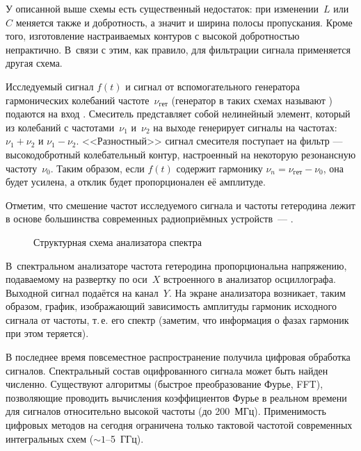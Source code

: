 \experiment

У описанной выше схемы есть существенный недостаток: при изменении~$L$ или~$C$
меняется также и добротность, а значит и ширина полосы пропускания.
Кроме того, изготовление настраиваемых контуров с высокой добротностью
непрактично. В~связи с этим, как правило, для фильтрации сигнала
применяется другая схема.

Исследуемый сигнал $f(t)$ и сигнал от вспомогательного генератора гармонических
колебаний частоте~$\nu_{гет}$ (генератор в таких схемах называют
) подаются на вход . Смеситель
представляет собой нелинейный элемент, который из колебаний с частотами~$\nu_1$
и~$\nu_2$ на выходе генерирует сигналы на 
частотах: $\nu_1 + \nu_2$ и $\nu_1 - \nu_2$.
<<Разностный>> сигнал смесителя поступает на фильтр ---
высокодобротный колебательный контур, настроенный на некоторую 
резонансную частоту~$\nu_0$. Таким образом, если $f(t)$ содержит гармонику
$\nu_n=\nu_{гет}-\nu_0$, она будет усилена, а отклик будет
пропорционален её амплитуде.

Отметим, что смешение частот исследуемого сигнала и частоты гетеродина лежит в
основе большинства современных радиоприёмных устройств~---
.

\begin{figure}[h!]
\hfil
{}
\caption{Структурная схема анализатора спектра}
\end{figure}

В~спектральном анализаторе частота гетеродина пропорциональна напряжению,
подаваемому на развертку по оси~$X$ встроенного в анализатор осциллографа.
Выходной сигнал подаётся на канал~$Y$. На экране анализатора возникает, таким
образом, график, изображающий зависимость амплитуды гармоник исходного сигнала
от частоты, т.\,е. его спектр (заметим, что информация о фазах гармоник при этом
теряется).

В последнее время повсеместное распространение получила цифровая обработка
сигналов. Спектральный состав оцифрованного сигнала может быть найден численно.
Существуют алгоритмы (быстрое преобразование Фурье, FFT), позволяющие проводить
вычисления коэффициентов Фурье в реальном времени для сигналов относительно
высокой частоты (до 200~МГц). Применимость цифровых методов на сегодня
ограничена только тактовой частотой современных интегральных схем ($\sim1$--5~ГГц).


